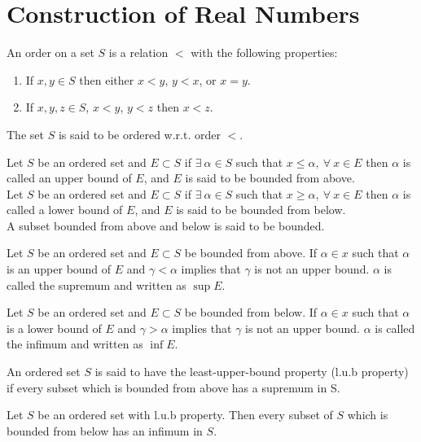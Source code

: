 \section{Construction of Real Numbers}
\begin{definition}
  An order on a set $S$ is a relation $<$ with the following properties:
  \begin{enumerate}
    \item If $x,y\in S$ then either $x<y$, $y<x$, or $x=y$.
    \item If $x,y,z\in S$, $x<y$, $y<z$ then $x<z$.
  \end{enumerate}
  The set $S$ is said to be ordered w.r.t. order $<$.
\end{definition}
\begin{definition}[Bounds]
  Let $S$ be an ordered set and $E\subset S$ if $\exists\ \alpha\in S$ such that $x \leq \alpha,\ \forall\ x\in E$ then $\alpha$ is called an upper bound of $E$, and $E$ is said to be bounded from above.\\

  Let $S$ be an ordered set and $E\subset S$ if $\exists\ \alpha\in S$ such that $x \geq \alpha,\ \forall\ x\in E$ then $\alpha$ is called a lower bound of $E$, and $E$ is said to be bounded from below.\\

  A subset bounded from above and below is said to be bounded.
\end{definition}
\begin{definition}[Supremum]
  Let $S$ be an ordered set and $E\subset S$ be bounded from above. If $\alpha\in x$ such that $\alpha$ is an upper bound of $E$ and $\gamma < \alpha$ implies that $\gamma$ is not an upper bound. $\alpha$ is called the supremum and written as $\sup E$. 
\end{definition}
\begin{definition}[Infimum]
  Let $S$ be an ordered set and $E\subset S$ be bounded from below. If $\alpha\in x$ such that $\alpha$ is a lower bound of $E$ and $\gamma > \alpha$ implies that $\gamma$ is not an upper bound. $\alpha$ is called the infimum and written as $\inf E$. 
\end{definition}
\begin{definition}
  An ordered set $S$ is said to have the least-upper-bound property (l.u.b property) if every subset which is bounded from above has a supremum in S.
\end{definition}
\begin{theorem}
  Let $S$ be an ordered set with l.u.b property. Then every subset of $S$ which is bounded from below has an infimum in $S$.
\end{theorem}
